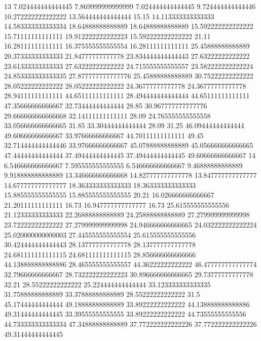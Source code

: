 13 7.024444444444445 7.869999999999999 7.024444444444445 9.724444444444446 10.272222222222222 13.564444444444444 15.15 14.113333333333333 14.583333333333334 18.64888888888889 18.64888888888889 15.592222222222222 15.71111111111111 19.912222222222223 15.592222222222222 21.11 16.28111111111111 16.375555555555554 16.28111111111111 25.45888888888889 20.37333333333333 21.84777777777778 23.834444444444443 27.63222222222222 23.61333333333333 27.63222222222222 24.715555555555557 23.582222222222224 24.853333333333335 27.877777777777776 25.45888888888889 30.75222222222222 28.05222222222222 28.05222222222222 24.36777777777778 24.36777777777778 28.94111111111111 44.65111111111111 28.494444444444444 44.65111111111111 47.35666666666667 32.73444444444444 28.85 30.967777777777776 29.666666666666668 32.14111111111111 28.09 24.765555555555558 33.056666666666665 31.85 33.30444444444444 28.09 31.25 46.09444444444444 49.60666666666667 33.97666666666667 44.70111111111111 49.45 32.714444444444446 33.97666666666667 45.07888888888889 45.056666666666665 47.44444444444444 37.49444444444445 37.49444444444445 49.60666666666667
14 6.546666666666667 7.595555555555555 6.546666666666667 9.46888888888889 9.918888888888889 13.346666666666668 14.827777777777778 13.847777777777777 14.677777777777777 18.363333333333333 18.363333333333333 15.885555555555555 15.885555555555555 20.21 16.026666666666667 21.20111111111111 16.73 16.947777777777777 16.73 25.615555555555556 21.12333333333333 22.26888888888889 24.25888888888889 27.279999999999998 23.72222222222222 27.279999999999998 24.946666666666665 24.032222222222224 25.020000000000003 27.445555555555554 25.615555555555556 30.424444444444443 28.137777777777778 28.137777777777778 24.681111111111115 24.681111111111115 28.856666666666666 44.138888888888886 28.465555555555557 44.36222222222222 46.477777777777774 32.79666666666667 28.732222222222223 30.896666666666665 29.73777777777778 32.21 28.55222222222222 25.224444444444444 33.123333333333335 31.75888888888889 33.37888888888889 28.55222222222222 31.5 45.17444444444444 49.18888888888889 33.89222222222222 44.138888888888886 49.31444444444445 33.39555555555555 33.89222222222222 44.73555555555556 44.733333333333334 47.34888888888889 37.772222222222226 37.772222222222226 49.31444444444445
